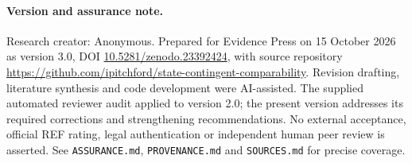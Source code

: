 \documentclass[11pt,a4paper]{article}
\begin{document}
\paragraph{Version and assurance note.} Research creator: Anonymous. Prepared for Evidence Press on 15 October 2026 as version 3.0, DOI \href{https://doi.org/10.5281/zenodo.23392424}{10.5281/zenodo.23392424}, with source repository \url{https://github.com/ipitchford/state-contingent-comparability}. Revision drafting, literature synthesis and code development were AI-assisted. The supplied automated reviewer audit applied to version 2.0; the present version addresses its required corrections and strengthening recommendations. No external acceptance, official REF rating, legal authentication or independent human peer review is asserted. See \texttt{ASSURANCE.md}, \texttt{PROVENANCE.md} and \texttt{SOURCES.md} for precise coverage.
\end{document}
